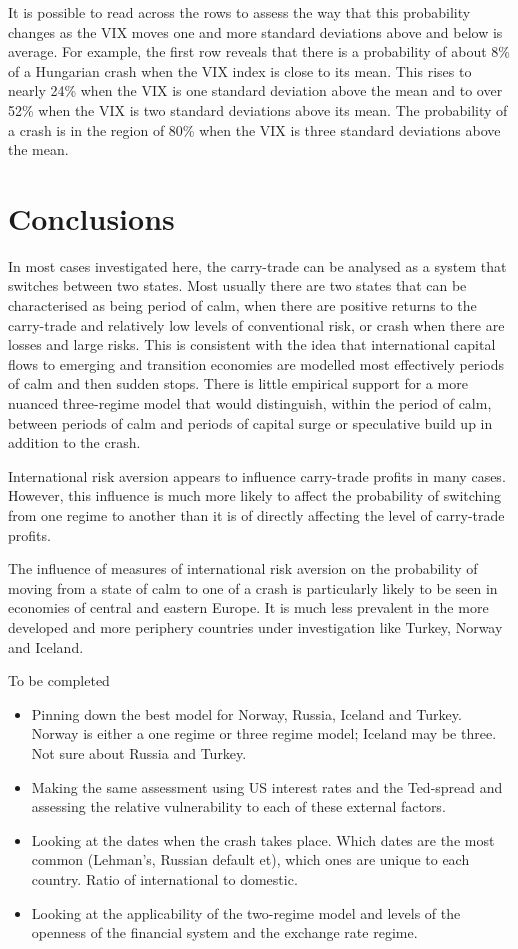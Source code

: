 \documentclass[12pt, a4paper, oneside]{article} %
\begin{document}
It is possible to read across the rows to assess the way that this probability changes as the VIX moves one and more standard deviations above and below is average.  For example, the first row reveals that there is a probability of about 8\% of a Hungarian crash when the VIX index is close to its mean. This rises to nearly 24\% when the VIX is one standard deviation above the mean and to over 52\% when the VIX is two standard deviations above its mean.  The probability of a crash is in the region of 80\% when the VIX is three standard deviations above the mean.  

\section{Conclusions}
In most cases investigated here, the carry-trade can be analysed as a system that switches between two states.  Most usually there are two states that can be characterised as being period of calm, when there are positive returns to the carry-trade and relatively low levels of conventional risk, or crash when there are losses and large risks.  This is consistent with the idea that international capital flows to emerging and transition economies are modelled most effectively periods of calm and then sudden stops.  There is little empirical support for a more nuanced three-regime model that would distinguish, within the period of calm, between periods of calm and periods of capital surge or speculative build up in addition to the crash. 

International risk aversion appears to influence carry-trade profits in many cases.  However, this influence is much more likely to affect the probability of switching from one regime to another than it is of directly affecting the level of carry-trade profits. 

The influence of measures of international risk aversion on the probability of moving from a state of calm to one of a crash is particularly likely to be seen in economies of central and eastern Europe.  It is much less prevalent in the more developed and more periphery countries under investigation like Turkey, Norway and Iceland. 

To be completed
\begin{itemize}
\item Pinning down the best model for Norway, Russia, Iceland and Turkey. Norway is either a one regime or three regime model; Iceland may be three.  Not sure about Russia and Turkey. 
\item Making the same assessment using US interest rates and the Ted-spread and assessing the relative vulnerability to each of these external factors. 
\item Looking at the dates when the crash takes place.  Which dates are the most common (Lehman's, Russian default et), which ones are unique to each country.  Ratio of international to domestic. 
\item Looking at the applicability of the two-regime model and levels of the openness of the financial system and the exchange rate regime.  
\end{itemize}
\end{document}
